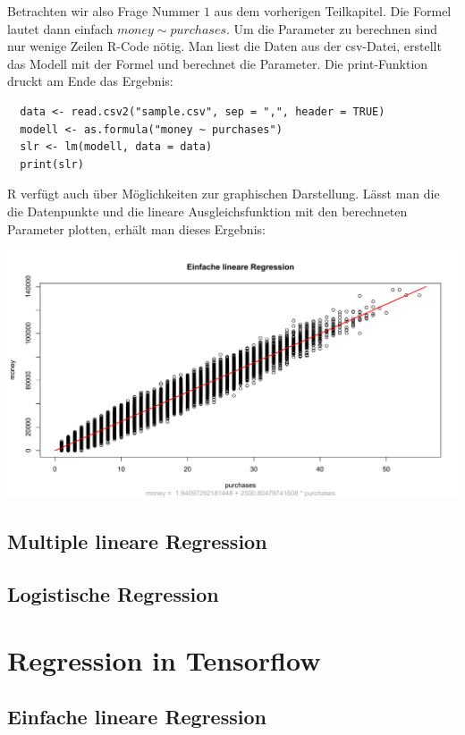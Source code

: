 Betrachten wir also Frage Nummer $1$ aus dem vorherigen Teilkapitel. Die Formel lautet dann einfach $money \sim purchases$. Um die Parameter zu berechnen sind nur wenige Zeilen R-Code nötig. Man liest die Daten aus der csv-Datei, erstellt das Modell mit der Formel und berechnet die Parameter. Die print-Funktion druckt am Ende das Ergebnis:

\begin{lstlisting}
  data <- read.csv2("sample.csv", sep = ",", header = TRUE)
  modell <- as.formula("money ~ purchases")
  slr <- lm(modell, data = data)
  print(slr)
\end{lstlisting}

R verfügt auch über Möglichkeiten zur graphischen Darstellung. Lässt man die die Datenpunkte und die lineare Ausgleichsfunktion mit den berechneten Parameter plotten, erhält man dieses Ergebnis:

\includegraphics[width=\textwidth]{r-simpleLinearRegression}

\subsection{Multiple lineare Regression}

\subsection{Logistische Regression}

\section{Regression in Tensorflow}

\subsection{Einfache lineare Regression}

